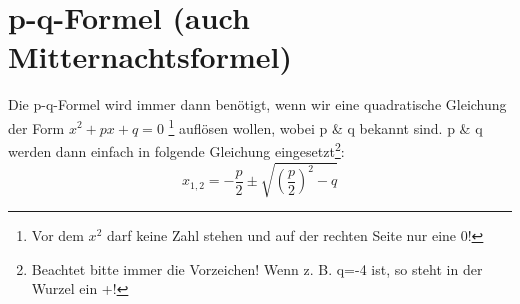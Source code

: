 \section{p-q-Formel (auch Mitternachtsformel)}
	Die p-q-Formel wird immer dann benötigt, wenn wir eine quadratische Gleichung
	der Form \(x^2 + p x + q = 0\) \footnote{Vor dem \(x^2\) darf keine Zahl stehen
	und auf der rechten Seite nur eine 0!} auflösen wollen, wobei p \& q bekannt
	sind. p \& q werden dann einfach in folgende Gleichung
	eingesetzt\footnote{Beachtet bitte immer die Vorzeichen! Wenn z. B. q=-4 ist,
	so steht in der Wurzel ein +!}:
	\[x_{1,2}=-\frac{p}{2}\pm \sqrt{\left ( \frac{p}{2} \right)^2-q}\]
